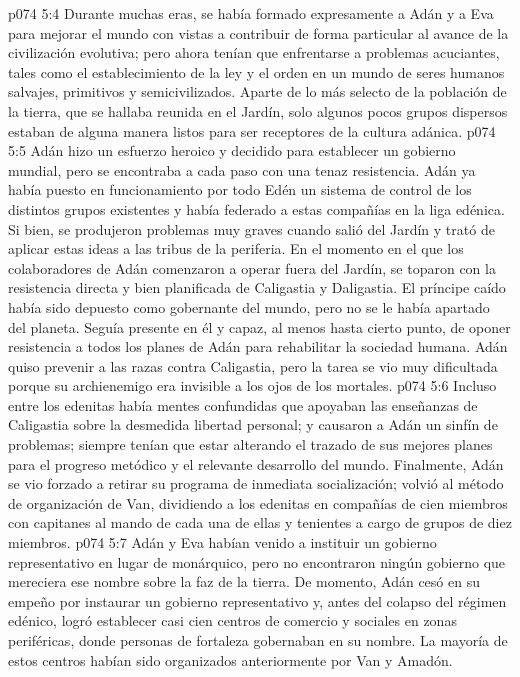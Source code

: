 \vs p074 5:4 Durante muchas eras, se había formado expresamente a Adán y a Eva para mejorar el mundo con vistas a contribuir de forma particular al avance de la civilización evolutiva; pero ahora tenían que enfrentarse a problemas acuciantes, tales como el establecimiento de la ley y el orden en un mundo de seres humanos salvajes, primitivos y semicivilizados. Aparte de lo más selecto de la población de la tierra, que se hallaba reunida en el Jardín, solo algunos pocos grupos dispersos estaban de alguna manera listos para ser receptores de la cultura adánica.
\vs p074 5:5 Adán hizo un esfuerzo heroico y decidido para establecer un gobierno mundial, pero se encontraba a cada paso con una tenaz resistencia. Adán ya había puesto en funcionamiento por todo Edén un sistema de control de los distintos grupos existentes y había federado a estas compañías en la liga edénica. Si bien, se produjeron problemas muy graves cuando salió del Jardín y trató de aplicar estas ideas a las tribus de la periferia. En el momento en el que los colaboradores de Adán comenzaron a operar fuera del Jardín, se toparon con la resistencia directa y bien planificada de Caligastia y Daligastia. El príncipe caído había sido depuesto como gobernante del mundo, pero no se le había apartado del planeta. Seguía presente en él y capaz, al menos hasta cierto punto, de oponer resistencia a todos los planes de Adán para rehabilitar la sociedad humana. Adán quiso prevenir a las razas contra Caligastia, pero la tarea se vio muy dificultada porque su archienemigo era invisible a los ojos de los mortales.
\vs p074 5:6 Incluso entre los edenitas había mentes confundidas que apoyaban las enseñanzas de Caligastia sobre la desmedida libertad personal; y causaron a Adán un sinfín de problemas; siempre tenían que estar alterando el trazado de sus mejores planes para el progreso metódico y el relevante desarrollo del mundo. Finalmente, Adán se vio forzado a retirar su programa de inmediata socialización; volvió al método de organización de Van, dividiendo a los edenitas en compañías de cien miembros con capitanes al mando de cada una de ellas y tenientes a cargo de grupos de diez miembros.
\vs p074 5:7 Adán y Eva habían venido a instituir un gobierno representativo en lugar de monárquico, pero no encontraron ningún gobierno que mereciera ese nombre sobre la faz de la tierra. De momento, Adán cesó en su empeño por instaurar un gobierno representativo y, antes del colapso del régimen edénico, logró establecer casi cien centros de comercio y sociales en zonas periféricas, donde personas de fortaleza gobernaban en su nombre. La mayoría de estos centros habían sido organizados anteriormente por Van y Amadón.
